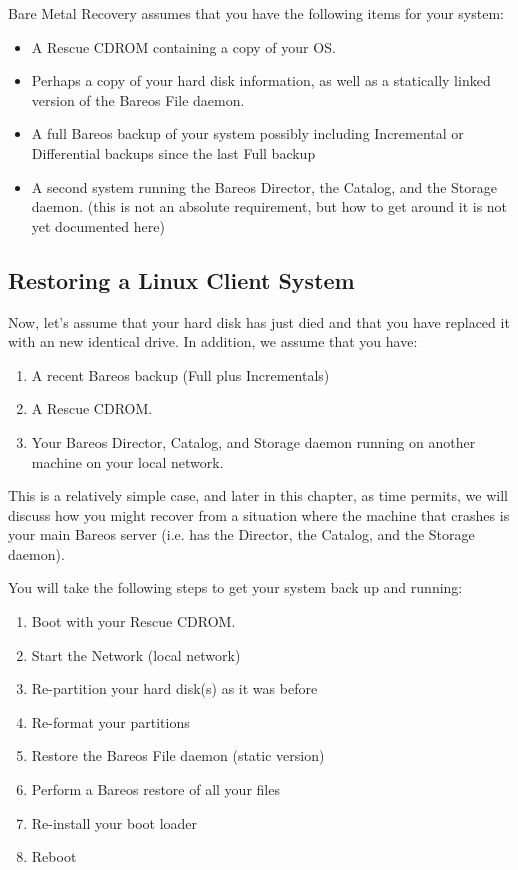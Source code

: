 Bare Metal Recovery assumes that you have the following items for your system:

\begin{itemize}
\item A Rescue CDROM containing a copy of your OS.
\item Perhaps a copy of your
   hard disk information, as well as a statically linked version of the
   Bareos File daemon.
\item A full Bareos backup of your system possibly including  Incremental or
   Differential backups since the last Full  backup
\item A second system running the Bareos Director, the Catalog, and the
   Storage daemon.  (this is not an absolute requirement, but how to get
   around it is not yet documented here)
\end{itemize}

\subsection{Restoring a Linux Client System}
\label{restore_client}

Now, let's assume that your hard disk has just died and that you have replaced
it with an new identical drive. In addition, we assume that you have:

\begin{enumerate}
\item A recent Bareos backup (Full plus Incrementals)
\item A Rescue CDROM.
\item Your Bareos Director, Catalog, and Storage daemon running  on another
   machine on your local network.
\end{enumerate}

This is a relatively simple case, and later in this chapter, as time permits,
we will discuss how you might recover from a situation where the machine that
crashes is your main Bareos server (i.e. has the Director, the Catalog, and
the Storage daemon).

You will take the following steps to get your system back up and running:

\begin{enumerate}
\item Boot with your Rescue CDROM.
\item Start the Network (local network)
\item Re-partition your hard disk(s) as it was before
\item Re-format your partitions
\item Restore the Bareos File daemon (static version)
\item Perform a Bareos restore of all your files
\item Re-install your boot loader
\item Reboot
\end{enumerate}

